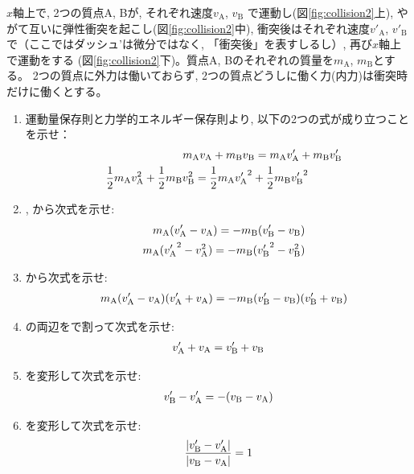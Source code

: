 \begin{q}\label{q:collision2}
$x$軸上で, 2つの質点A, Bが, それぞれ速度$v_{\text{A}}$, $v_{\text{B}}$
で運動し(図\ref{fig:collision2}上), やがて互いに弾性衝突を起こし(図\ref{fig:collision2}中), 
衝突後はそれぞれ速度$v'_{\text{A}}$, $v'_{\text{B}}$で（ここではダッシュ'は微分ではなく, 
「衝突後」を表すしるし）, 再び$x$軸上で運動をする
(図\ref{fig:collision2}下)。質点A, Bのそれぞれの質量を$m_{\text{A}}$, $m_{\text{B}}$とする。
2つの質点に外力は働いておらず, 2つの質点どうしに働く力(内力)は衝突時だけに働くとする。

\begin{enumerate}
\item 運動量保存則と力学的エネルギー保存則より, 以下の2つの式が成り立つことを示せ：
\begin{eqnarray}
&&m_{\text A}v_{\text A}+m_{\text B}v_{\text B}=m_{\text A}v'_{\text A}+m_{\text B}v'_{\text B}\label{eq:collision2_03}\\
&&\frac{1}{2}m_{\text A}v_{\text A}^2+\frac{1}{2}m_{\text B}v_{\text B}^2
=\frac{1}{2}m_{\text A}{v'_{\text A}}^2+\frac{1}{2}m_{\text B}{v'_{\text B}}^2\quad\quad\quad\label{eq:collision2_05}
\end{eqnarray}
\item {}, から次式を示せ:
\begin{eqnarray}
&&m_{\text A}(v'_{\text A}-v_{\text A})=-m_{\text B}(v'_{\text B}-v_{\text B})\label{eq:collision2_07}\\
&&m_{\text A}({v'_{\text A}}^2-v_{\text A}^2)=-m_{\text B}({v'_{\text B}}^2-v_{\text B}^2)\label{eq:collision2_09}
\end{eqnarray}
\item {}から次式を示せ:
\begin{eqnarray}
&&m_{\text A}(v'_{\text A}-v_{\text A})(v'_{\text A}+v_{\text A})=-m_{\text B}(v'_{\text B}-v_{\text B})(v'_{\text B}+v_{\text B})\nonumber\\\label{eq:collision2_11}
\end{eqnarray}
\item {}の両辺をで割って次式を示せ:
\begin{eqnarray}
v'_{\text A}+v_{\text A}=v'_{\text B}+v_{\text B}\label{eq:collision2_13}
\end{eqnarray}
\item {}を変形して次式を示せ:
\begin{eqnarray}
v'_{\text B}-v'_{\text A}=-(v_{\text B}-v_{\text A})\label{eq:collision2_14}
\end{eqnarray}
\item {}を変形して次式を示せ:
\begin{eqnarray}
\frac{|v'_{\text B}-v'_{\text A}|}{|v_{\text B}-v_{\text A}|}=1\label{eq:collision2_145}
\end{eqnarray}
\end{enumerate}
\end{q}\mv\mv

